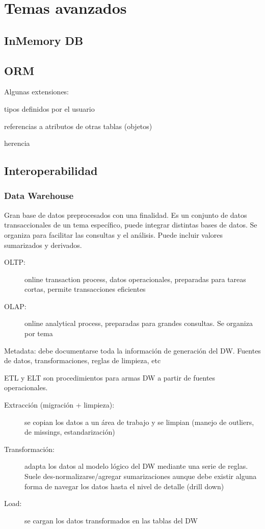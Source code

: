 \chapter{Temas avanzados}

\section{InMemory DB}

\section{ORM}

Algunas extensiones:

tipos definidos por el usuario

referencias a atributos de otras tablas (objetos)

herencia

\section{Interoperabilidad}

\subsection{Data Warehouse}

Gran base de datos preprocesados con una finalidad. Es un conjunto de datos transaccionales de un tema específico, puede integrar distintas bases de datos. Se organiza para facilitar las consultas y el análisis. Puede incluir valores sumarizados y derivados.

\begin{description}
	\item[OLTP:] online transaction process, datos operacionales, preparadas para tareas cortas, permite transacciones eficientes
	\item[OLAP:] online analytical process, preparadas para grandes consultas. Se organiza por tema
\end{description}

Metadata: debe documentarse toda la información de generación del DW. Fuentes de datos, transformaciones, reglas de limpieza, etc

ETL y ELT son procedimientos para armas DW a partir de fuentes operacionales.

\begin{description}
	\item[Extracción (migración + limpieza):] se copian los datos a un área de trabajo y se limpian (manejo de outliers, de missings, estandarización)
	\item[Transformación:] adapta los datos al modelo lógico del DW mediante una serie de reglas. Suele des-normalizarse/agregar sumarizaciones aunque debe existir alguna forma de navegar los datos hasta el nivel de detalle (drill down)
	\item[Load:] se cargan los datos transformados en las tablas del DW
\end{description}

